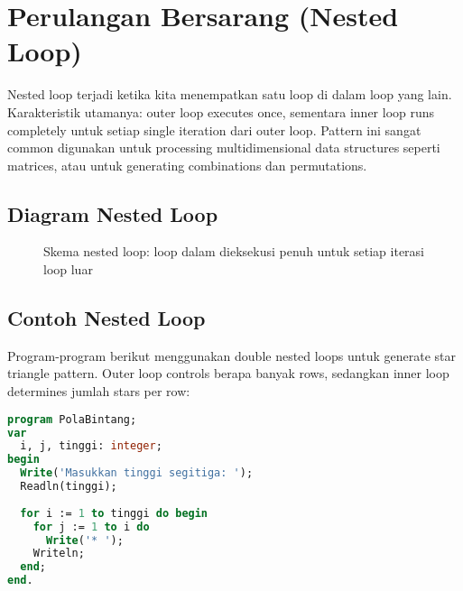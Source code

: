 \documentclass[../main.tex]{subfiles}
\begin{document}
\section{Perulangan Bersarang (Nested Loop)}
Nested loop terjadi ketika kita menempatkan satu loop di dalam loop yang lain. Karakteristik utamanya: outer loop executes once, sementara inner loop runs completely untuk setiap single iteration dari outer loop. Pattern ini sangat common digunakan untuk processing multidimensional data structures seperti matrices, atau untuk generating combinations dan permutations.

\subsection{Diagram Nested Loop}
\begin{figure}[H]
  \centering
  \caption{Skema nested loop: loop dalam dieksekusi penuh untuk setiap iterasi loop luar}
\end{figure}

\subsection{Contoh Nested Loop}

Program-program berikut menggunakan double nested loops untuk generate star triangle pattern. Outer loop controls berapa banyak rows, sedangkan inner loop determines jumlah stars per row:

\begin{lstlisting}[language=Pascal, caption={Pola segitiga dengan nested loop (Pascal)}]
program PolaBintang;
var
  i, j, tinggi: integer;
begin
  Write('Masukkan tinggi segitiga: ');
  Readln(tinggi);
  
  for i := 1 to tinggi do begin
    for j := 1 to i do
      Write('* ');
    Writeln;
  end;
end.
\end{lstlisting}
\end{document}
